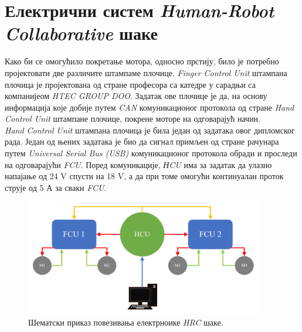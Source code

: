 \documentclass{article}
\begin{document}
\clearpage

\section{Електрични систем \textit{Human-Robot Collaborative} шаке}

Како би се омогућило покретање мотора, односно прстију, било је потребно пројектовати две различите штампаме плочице. 
\textit{Finger Control Unit} штампана плочица је пројектована од стране професора са катедре 
у сарадњи са компанијеом \textit{HTEC GROUP DOO}. Задатак ове плочице је да, на основу информација које добије 
путем \textit{CAN} комуникационог протокола од стране \textit{Hand Control Unit} штампане плочице, 
покрене моторе на одговарајућ начин.\\ 
\textit{Hand Control Unit} штампана плочица је била један од задатака овог дипломског рада. 
Један од њених задатака је био да сигнал примљен од стране рачунара путем \textit{Universal Serial Bus (USB)} комуникационог 
протокола обради и проследи на одговарајући \textit{FCU}. Поред комуникације, \textit{НCU} има за задатак да улазно напајање 
од 24 V спусти на 18 V, а да при томе омогући континуалан проток струје од 5 А за сваки \textit{FCU}.
\begin{figure}[H]
\centering
\includegraphics[height=2in]{Images/SemaElektronika.png}
\caption{Шематски приказ повезивања електрноике \textit{HRC} шаке.}
\label{fig:figure7}
\end{figure}
\end{document}
